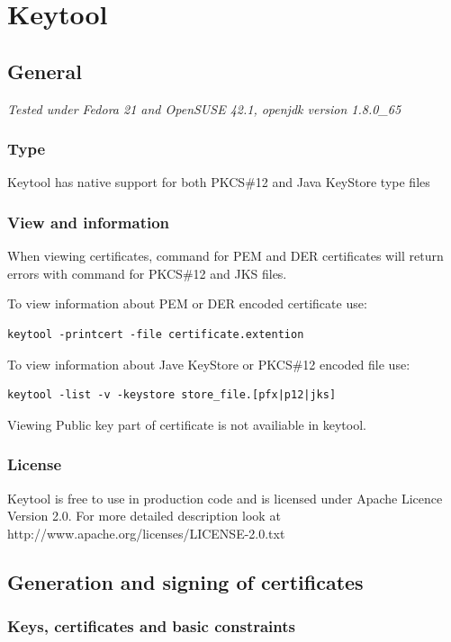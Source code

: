 \documentclass[10pt, a4paper]{report}
\begin{document}
\chapter{Keytool}

\section{General}

\textit{Tested under Fedora 21 and OpenSUSE 42.1, openjdk version 1.8.0\_65}

  \subsection{Type}
Keytool has native support for both PKCS\#12 and Java KeyStore type files 
  \subsection{View and information}
When viewing certificates, command for PEM and DER certificates will return errors with command for PKCS\#12 and JKS files.

To view information about PEM or DER encoded certificate use:
\begin{verbatim}
keytool -printcert -file certificate.extention
\end{verbatim}

To view information about Jave KeyStore or PKCS\#12 encoded file use:
\begin{verbatim}
keytool -list -v -keystore store_file.[pfx|p12|jks]
\end{verbatim}

Viewing Public key part of certificate is not availiable in keytool.

  \subsection{License}
Keytool is free to use in production code and is licensed under Apache Licence Version 2.0. For more detailed description look at http://www.apache.org/licenses/LICENSE-2.0.txt
  
\section{Generation and signing of certificates}

  \subsection{Keys, certificates and basic constraints}
  
\end{document}
